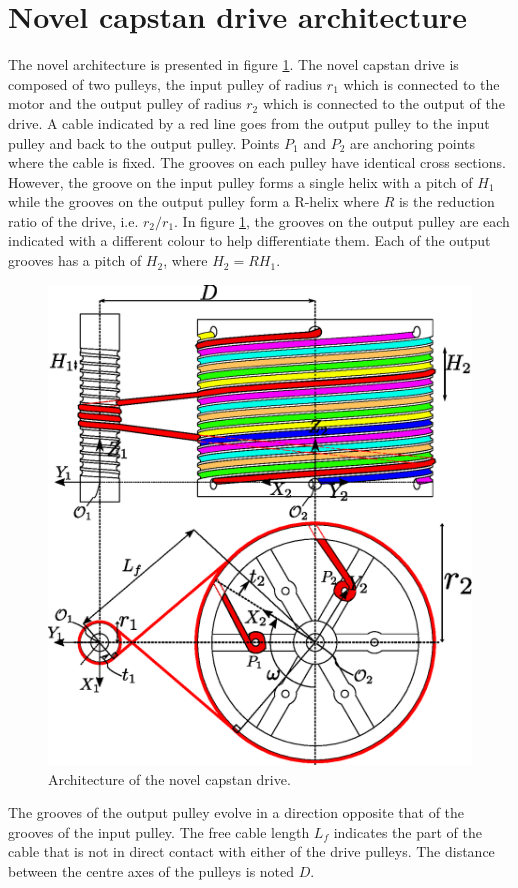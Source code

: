   \section{Novel capstan drive architecture}
 The novel architecture is presented in figure \ref{fig:novel_arch}. The novel capstan drive is composed of two pulleys, the input pulley of radius $r_1$ which is connected to the motor and the output pulley of radius $r_2$ which is connected to the output of the drive.  A cable indicated by a red line goes from the output pulley to the input pulley and back to the output pulley. Points $P_1$ and $P_2$ are anchoring points where the cable is fixed. The grooves on each pulley have identical cross sections. However, the groove on the input pulley forms a single helix with a pitch of $H_1$ while the grooves on the output pulley form a R-helix where $R$ is the reduction ratio of the drive, i.e. $r_2/r_1$. In figure \ref{fig:novel_arch}, the grooves on the output pulley are each indicated with a different colour to help differentiate them. Each of the output grooves has a pitch of $H_2$, where $H_2 = RH_1$.
 \begin{figure}
     \centering
     \includegraphics[width =0.8\columnwidth]{test_print_poulies.eps}
     \caption{Architecture of the novel capstan drive.}
     \label{fig:novel_arch}
 \end{figure}
 The grooves of the output pulley evolve in a direction opposite that of the grooves of the input pulley. The free cable length $L_f$ indicates the part of the cable that is not in direct contact with either of the drive pulleys. The distance between the centre axes of the pulleys is noted $D$. \\
